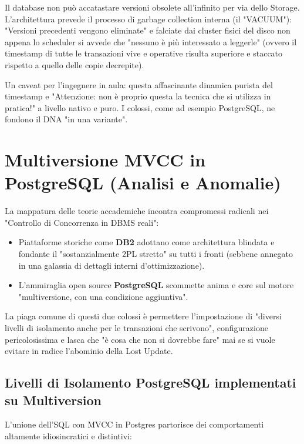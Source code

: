 Il database non può accatastare versioni obsolete all'infinito per via dello Storage. L'architettura prevede il processo di garbage collection interna (il "VACUUM"): "Versioni precedenti vengono eliminate" e falciate dai cluster fisici del disco non appena lo scheduler si avvede che "nessuno è più interessato a leggerle" (ovvero il timestamp di tutte le transazioni vive e operative risulta superiore e staccato rispetto a quello delle copie decrepite).

Un caveat per l'ingegnere in aula: questa affascinante dinamica purista del timestamp e "Attenzione: non è proprio questa la tecnica che si utilizza in pratica!" a livello nativo e puro. I colossi, come ad esempio PostgreSQL, ne fondono il DNA "in una variante".

\section{Multiversione MVCC in PostgreSQL (Analisi e Anomalie)}

La mappatura delle teorie accademiche incontra compromessi radicali nei "Controllo di Concorrenza in DBMS reali":
\begin{itemize}
    \item Piattaforme storiche come \textbf{DB2} adottano come architettura blindata e fondante il "sostanzialmente 2PL stretto" su tutti i fronti (sebbene annegato in una galassia di dettagli interni d'ottimizzazione).
    \item L'ammiraglia open source \textbf{PostgreSQL} scommette anima e core sul motore "multiversione, con una condizione aggiuntiva".
\end{itemize}
La piaga comune di questi due colossi è permettere l'impostazione di "diversi livelli di isolamento anche per le transazioni che scrivono", configurazione pericolosissima e lasca che "è cosa che non si dovrebbe fare" mai se si vuole evitare in radice l'abominio della Lost Update.

\subsection{Livelli di Isolamento PostgreSQL implementati su Multiversion}
L'unione dell'SQL con MVCC in Postgres partorisce dei comportamenti altamente idiosincratici e distintivi:

